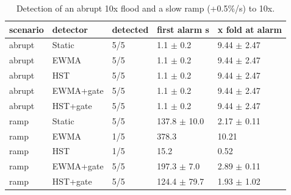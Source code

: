 \begin{table}[t]
\centering\small
\caption{Detection of an abrupt 10x flood and a slow ramp (+0.5\%/s) to 10x.}\label{tab:detection}
\begin{tabular}{lllll}
\toprule
scenario & detector & detected & first alarm s & x fold at alarm \\
\midrule
abrupt & Static & 5/5 & 1.1 $\pm$ 0.2 & 9.44 $\pm$ 2.47 \\
abrupt & EWMA & 5/5 & 1.1 $\pm$ 0.2 & 9.44 $\pm$ 2.47 \\
abrupt & HST & 5/5 & 1.1 $\pm$ 0.2 & 9.44 $\pm$ 2.47 \\
abrupt & EWMA+gate & 5/5 & 1.1 $\pm$ 0.2 & 9.44 $\pm$ 2.47 \\
abrupt & HST+gate & 5/5 & 1.1 $\pm$ 0.2 & 9.44 $\pm$ 2.47 \\
ramp & Static & 5/5 & 137.8 $\pm$ 10.0 & 2.17 $\pm$ 0.11 \\
ramp & EWMA & 1/5 & 378.3 & 10.21 \\
ramp & HST & 1/5 & 15.2 & 0.52 \\
ramp & EWMA+gate & 5/5 & 197.3 $\pm$ 7.0 & 2.89 $\pm$ 0.11 \\
ramp & HST+gate & 5/5 & 124.4 $\pm$ 79.7 & 1.93 $\pm$ 1.02 \\
\bottomrule
\end{tabular}
\end{table}

